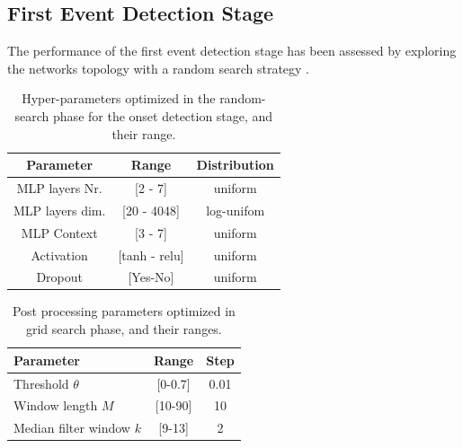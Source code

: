 \documentclass{article}
\begin{document}
\begin{sloppy}
\subsection{First Event Detection Stage}
The performance of the first event detection stage has been assessed by exploring the networks topology with a random search strategy \cite{bergstra2012random}.
\begin{table}[t]
  \caption{Hyper-parameters optimized in the random-search phase for the onset detection stage, and their range.}\label{tbl:hyper-params-mlp}
  \centering
  \footnotesize
  \begin{tabular} {|c | c | c|}
    \hline
    Parameter & Range & Distribution\\  
    \hline
    \hline                                     
    MLP layers Nr.  & [2 - 7]& uniform \\
    \hline                                     
    MLP layers dim. & [20 - 4048]& log-unifom \\
    \hline                                     
    MLP Context & [3 - 7] & uniform\\
    \hline
    Activation & [tanh - relu] & uniform\\
    \hline
    Dropout & [Yes-No] & uniform\\
    \hline
  \end{tabular}
\end{table}
%
\begin{table}[t]
  \caption{Post processing parameters optimized in grid search phase, and their ranges.}
  \label{tbl:post-proc-params-mlp}
  \centering
  \footnotesize
  \begin{tabular} {|l | c | c |}
    \hline
    Parameter     & Range  & Step\\  
    \hline
    \hline                                     
    Threshold $\theta$ & [0-0.7] & 0.01\\
    \hline                                     
    Window length $M$ & [10-90] & 10 \\
    \hline
    Median filter window $k$ & [9-13] & 2\\
    \hline                                       
  \end{tabular}
\end{table}


\end{sloppy}
\end{document}
